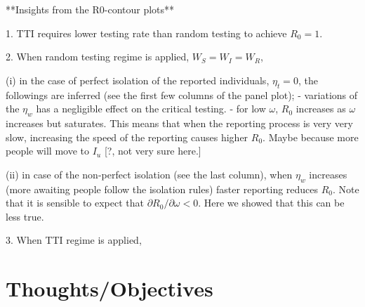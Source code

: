 \documentclass{article}\usepackage[]{graphicx}\usepackage[]{color}
\begin{document}
**Insights from the R0-contour plots**

1. TTI requires lower testing rate than random testing to achieve $R_0=1$.

2. When random testing regime is applied, $W_S=W_I=W_R$,

(i) in the case of perfect isolation of the reported individuals, $\eta_t=0$, the followings are inferred (see the first few columns of the panel plot); 
 - variations of the $\eta_w$ has a negligible effect on the critical testing.
 - for low $\omega$, $R_0$ increases as $\omega$ increases but saturates. This means that when the reporting process is very very slow, increasing the speed of the reporting causes higher $R_0$. Maybe because more people will move to $I_u$ [?, not very sure here.]
 
 (ii) in case of the non-perfect isolation (see the last column), when $\eta_w$ increases (more awaiting people follow the isolation rules) faster reporting reduces $R_0$.  
Note that it is sensible to expect that $\partial{R_0}/\partial{\omega}<0$. Here we showed that this can be less true. 

3. When TTI regime is applied,


\section{Thoughts/Objectives}
\end{document}
